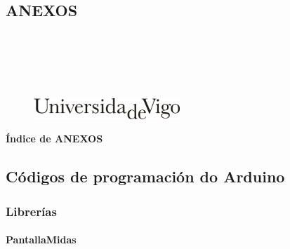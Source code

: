 \documentclass[11pt,twoside]{book}
\begin{document}
\begin{center}
\begin{normalsize}
\begin{center}
\part{\bf{ANEXOS}}\thispagestyle{empty}
\end{center}
\end{normalsize}
\ \\
\ \\
\ \\
\ \\

\begin{center}
\begin{figure}[htbp]
\begin{center}
\includegraphics[angle=0, height=0.8cm]{images/UVIGOLogo.png}
\end{center}
\end{figure}
\end{center}

\end{center}

\cleardoublepage


\pagestyle{fancy}
\startcontents[parts]
\cleardoublepage

\begin{center}{\large \bf Índice de ANEXOS}\end{center}

{\hypersetup{hidelinks}}

\cleardoublepage
\chapter{Códigos de programación do Arduino}

\section{Librerías}

\subsection{PantallaMidas}
\end{document}
